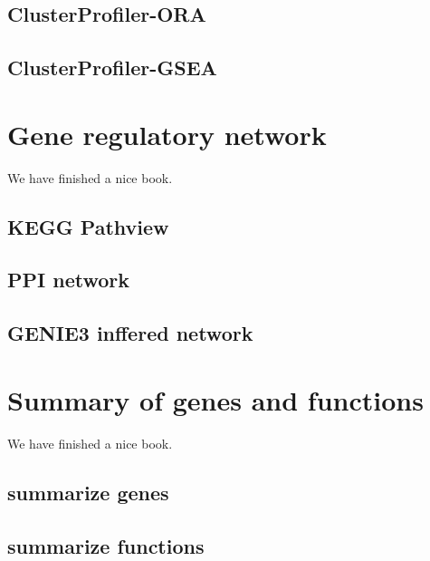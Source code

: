 \documentclass[
  a4paper,
  oneside]{book}
\begin{document}
\hypertarget{clusterprofiler-ora}{%
\section{ClusterProfiler-ORA}\label{clusterprofiler-ora}}

\hypertarget{clusterprofiler-gsea}{%
\section{ClusterProfiler-GSEA}\label{clusterprofiler-gsea}}

\hypertarget{gene-regulatory-network}{%
\chapter{Gene regulatory network}\label{gene-regulatory-network}}

We have finished a nice book.

\hypertarget{kegg-pathview}{%
\section{KEGG Pathview}\label{kegg-pathview}}

\hypertarget{ppi-network}{%
\section{PPI network}\label{ppi-network}}

\hypertarget{genie3-inffered-network}{%
\section{GENIE3 inffered network}\label{genie3-inffered-network}}

\hypertarget{summary-of-genes-and-functions}{%
\chapter{Summary of genes and functions}\label{summary-of-genes-and-functions}}

We have finished a nice book.

\hypertarget{summarize-genes}{%
\section{summarize genes}\label{summarize-genes}}

\hypertarget{summarize-functions}{%
\section{summarize functions}\label{summarize-functions}}

  
\end{document}
